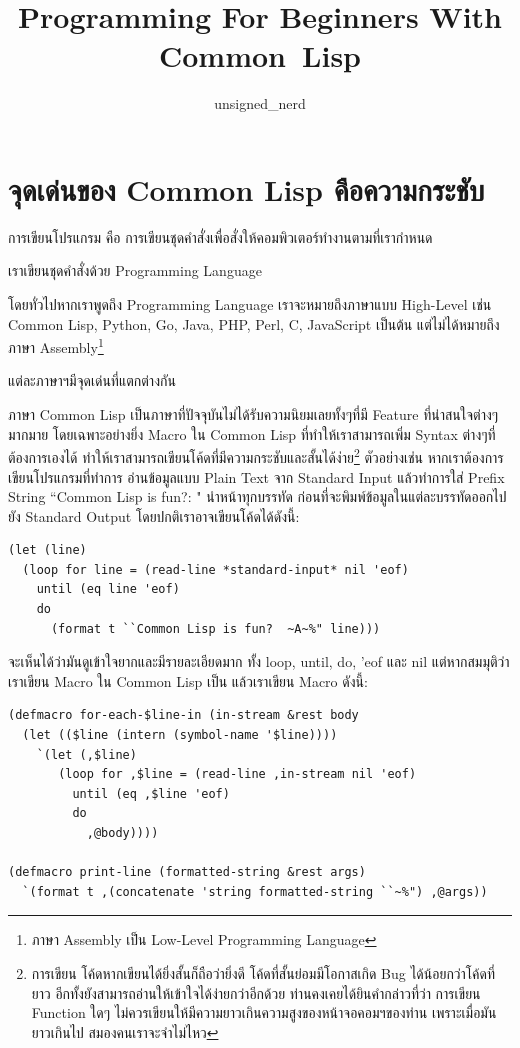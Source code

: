 \documentclass[a4paper]{article}
\begin{document}
\title{Programming For Beginners With Common~Lisp}
\author{unsigned\_nerd}
\maketitle

\tableofcontents

\section{จุดเด่นของ Common Lisp คือความกระชับ}

การเขียนโปรแกรม คือ การเขียนชุดคำสั่งเพื่อสั่งให้คอมพิวเตอร์ทำงานตามที่เรากำหนด

เราเขียนชุดคำสั่งด้วย Programming Language

โดยทั่วไปหากเราพูดถึง Programming Language เราจะหมายถึงภาษาแบบ High-Level เช่น
Common Lisp, Python, Go, Java, PHP, Perl, C, JavaScript เป็นต้น
แต่ไม่ได้หมายถึงภาษา Assembly\footnote{ภาษา Assembly เป็น Low-Level
Programming Language}

แต่ละภาษาฯมีจุดเด่นที่แตกต่างกัน

ภาษา Common Lisp เป็นภาษาที่ปัจจุบันไม่ได้รับความนิยมเลยทั้งๆที่มี Feature ที่น่าสนใจต่างๆ%
มากมาย โดยเฉพาะอย่างยิ่ง Macro ใน Common Lisp ที่ทำให้เราสามารถเพิ่ม Syntax ต่างๆที่%
ต้องการเองได้ ทำให้เราสามารถเขียนโค้ดที่มีความกระชับและสั้นได้ง่าย\footnote{การเขียน%
โค้ดหากเขียนได้ยิ่งสั้นก็ถือว่ายิ่งดี โค้ดที่สั้นย่อมมีโอกาสเกิด Bug ได้น้อยกว่าโค้ดที่ยาว
อีกทั้งยังสามารถอ่านให้เข้าใจได้ง่ายกว่าอีกด้วย ท่านคงเคยได้ยินคำกล่าวที่ว่า การเขียน
Function ใดๆ ไม่ควรเขียนให้มีความยาวเกินความสูงของหน้าจอคอมฯของท่าน เพราะเมื่อมัน%
ยาวเกินไป สมองคนเราจะจำไม่ไหว} ตัวอย่างเช่น หากเราต้องการเขียนโปรแกรมที่ทำการ%
อ่านข้อมูลแบบ Plain Text จาก Standard Input
แล้วทำการใส่ Prefix String ``Common Lisp is fun?: " นำหน้าทุกบรรทัด
ก่อนที่จะพิมพ์ข้อมูลในแต่ละบรรทัดออกไปยัง Standard Output โดยปกติเราอาจเขียนโค้ดได้ดังนี้:

\begin{lstlisting}[caption=โค้ดแบบปกติ\label{lst:regular-print-each-line-code}]
(let (line)
  (loop for line = (read-line *standard-input* nil 'eof)
    until (eq line 'eof)
    do
      (format t ``Common Lisp is fun?  ~A~%" line)))
\end{lstlisting}

จะเห็นได้ว่ามันดูเข้าใจยากและมีรายละเอียดมาก ทั้ง loop, until, do, 'eof และ
nil แต่หากสมมุติว่าเราเขียน Macro ใน Common Lisp เป็น แล้วเราเขียน Macro ดังนี้:

\begin{lstlisting}[caption=Macro for-each-\$line-in \& print-line]
(defmacro for-each-$line-in (in-stream &rest body
  (let (($line (intern (symbol-name '$line))))
    `(let (,$line)
       (loop for ,$line = (read-line ,in-stream nil 'eof)
         until (eq ,$line 'eof)
         do
           ,@body))))

(defmacro print-line (formatted-string &rest args)
  `(format t ,(concatenate 'string formatted-string ``~%") ,@args))
\end{lstlisting}
\end{document}
